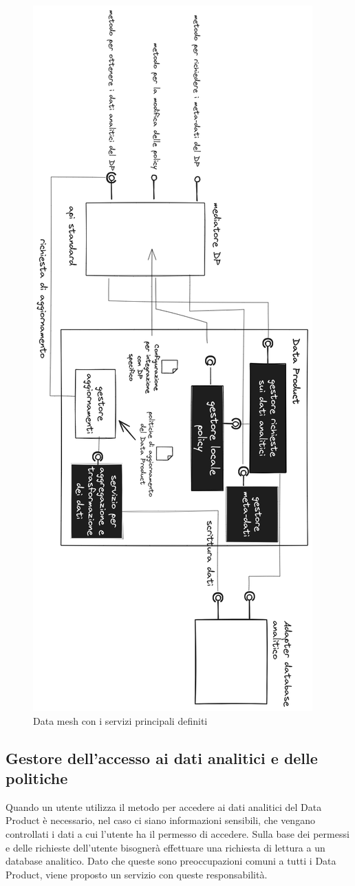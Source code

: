 \documentclass[a4paper,12pt]{report}
\begin{document}
\begin{figure}
    \centering
    \includegraphics[width=0.5\linewidth]{immagini/Data Mesh supporto agli aggiornamenti 2024-03-08 15.55.58.excalidraw.png}
    \caption{Data mesh con i servizi principali definiti}
    \label{fig:dp supporto aggiornamenti}
\end{figure}

\subsection{Gestore dell'accesso ai dati analitici e delle politiche}
Quando un utente utilizza il metodo per accedere ai dati analitici del Data Product è necessario, nel caso ci siano informazioni sensibili, che vengano controllati i dati a cui l'utente ha il permesso di accedere.
Sulla base dei permessi e delle richieste dell'utente bisognerà effettuare una richiesta di lettura a un database analitico.
Dato che queste sono preoccupazioni comuni a tutti i Data Product, viene proposto un servizio con queste responsabilità.
\end{document}
